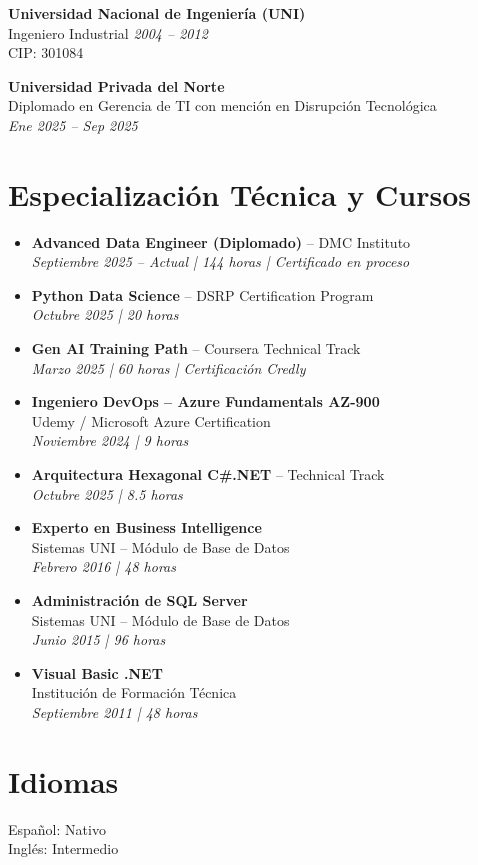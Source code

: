 \documentclass[11pt,a4paper]{article}
\begin{document}
\textbf{Universidad Nacional de Ingeniería (UNI)}\\
Ingeniero Industrial \hfill \textit{2004 – 2012}\\
CIP: 301084

\vspace{4pt}

\textbf{Universidad Privada del Norte}\\
Diplomado en Gerencia de TI con mención en Disrupción Tecnológica\\
\textit{Ene 2025 – Sep 2025}

\vspace{6pt}


\vspace{4pt}
\section*{Especialización Técnica y Cursos}
\begin{itemize}
   \item \textbf{Advanced Data Engineer (Diplomado)} – DMC Instituto\\
  \textit{Septiembre 2025 – Actual | 144 horas | Certificado en proceso}

  \item \textbf{Python Data Science} – DSRP Certification Program\\
  \textit{Octubre 2025 | 20 horas}

  \item \textbf{Gen AI Training Path} – Coursera Technical Track\\
  \textit{Marzo 2025 | 60 horas | Certificación Credly}

  \item \textbf{Ingeniero DevOps – Azure Fundamentals AZ-900}\\
  Udemy / Microsoft Azure Certification\\
  \textit{Noviembre 2024 | 9 horas}

  \item \textbf{Arquitectura Hexagonal C\#.NET} – Technical Track\\
  \textit{Octubre 2025 | 8.5 horas}

  \item \textbf{Experto en Business Intelligence}\\
  Sistemas UNI – Módulo de Base de Datos\\
  \textit{Febrero 2016 | 48 horas}

  \item \textbf{Administración de SQL Server}\\
  Sistemas UNI – Módulo de Base de Datos\\
  \textit{Junio 2015 | 96 horas}

  \item \textbf{Visual Basic .NET}\\
  Institución de Formación Técnica\\
  \textit{Septiembre 2011 | 48 horas}
\end{itemize}

\section*{Idiomas}

Español: Nativo\\
Inglés: Intermedio
\end{document}
